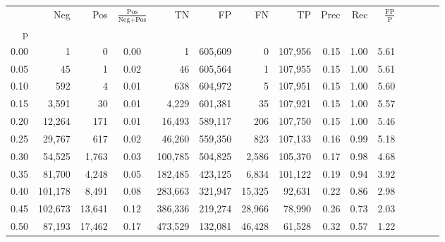 \begin{tabular}{rrrcrrrrrrrrrrr}
\toprule
{} &      Neg &     Pos & $\frac{\text{Pos}}{\text{Neg}+\text{Pos}}$ &       TN &       FP &       FN &       TP &  Prec &   Rec & $\frac{\text{FP}}{\text{P}}$ \\
p    &          &         &                                            &          &          &          &          &       &       &                              \\
\midrule
0.00 &        1 &       0 &                                       0.00 &        1 &  605,609 &        0 &  107,956 &  0.15 &  1.00 &                         5.61 \\
0.05 &       45 &       1 &                                       0.02 &       46 &  605,564 &        1 &  107,955 &  0.15 &  1.00 &                         5.61 \\
0.10 &      592 &       4 &                                       0.01 &      638 &  604,972 &        5 &  107,951 &  0.15 &  1.00 &                         5.60 \\
0.15 &    3,591 &      30 &                                       0.01 &    4,229 &  601,381 &       35 &  107,921 &  0.15 &  1.00 &                         5.57 \\
0.20 &   12,264 &     171 &                                       0.01 &   16,493 &  589,117 &      206 &  107,750 &  0.15 &  1.00 &                         5.46 \\
0.25 &   29,767 &     617 &                                       0.02 &   46,260 &  559,350 &      823 &  107,133 &  0.16 &  0.99 &                         5.18 \\
0.30 &   54,525 &   1,763 &                                       0.03 &  100,785 &  504,825 &    2,586 &  105,370 &  0.17 &  0.98 &                         4.68 \\
0.35 &   81,700 &   4,248 &                                       0.05 &  182,485 &  423,125 &    6,834 &  101,122 &  0.19 &  0.94 &                         3.92 \\
0.40 &  101,178 &   8,491 &                                       0.08 &  283,663 &  321,947 &   15,325 &   92,631 &  0.22 &  0.86 &                         2.98 \\
0.45 &  102,673 &  13,641 &                                       0.12 &  386,336 &  219,274 &   28,966 &   78,990 &  0.26 &  0.73 &                         2.03 \\
0.50 &   87,193 &  17,462 &                                       0.17 &  473,529 &  132,081 &   46,428 &   61,528 &  0.32 &  0.57 &                         1.22 \\

\end{tabular}
